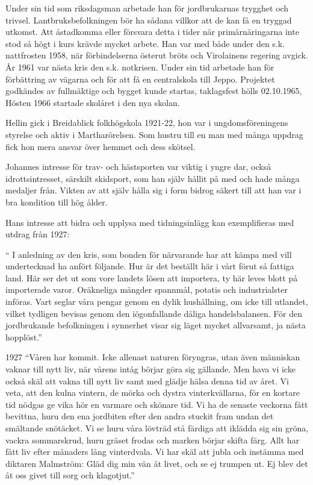 
Under sin tid som riksdagsman arbetade han för jordbrukarnas trygghet och trivsel. Lantbruksbefolkningen bör ha sådana villkor att de kan få en tryggad utkomst. Att åstadkomma eller försvara detta i tider när primärnäringarna inte stod så högt i kurs krävde mycket arbete. Han var med både under den s.k. nattfrosten 1958, när förbindelserna österut bröts och Virolainens regering avgick. År 1961 var nästa kris den s.k. notkrisen. Under sin tid arbetade han för förbättring av vägarna och för att få en centralskola till Jeppo. Projektet godkändes av fullmäktige och bygget kunde startas, taklagsfest hölls 02.10.1965, Hösten 1966 startade skolåret i den nya skolan.

Hellin gick i Breidablick folkhögskola 1921-22, hon  var i ungdomsföreningens styrelse och aktiv i Martharörelsen. Som hustru till en man med många uppdrag fick hon mera ansvar över hemmet och dess skötsel.

Johannes intresse för trav- och hästsporten var viktig i yngre dar, också idrottsintresset, särskilt skidsport, som han själv hållit på med och hade många medaljer från. Vikten av att själv hålla sig i form bidrog säkert till att han var i bra kondition till hög ålder.

Hans intresse att bidra och upplysa med tidningsinlägg kan exemplifieras med utdrag från 1927:

`` I anledning av den kris, som bonden för närvarande har att kämpa med vill undertecknad ha anfört följande. Hur är det beställt här i vårt förut så fattiga land. Här ser det ut som vore landets lösen att importera, ty här leves blott på importerade varor. Oräkneliga mängder spannmål, potatis och industrialster införas. Vart seglar våra pengar genom en dylik hushållning, om icke till utlandet, vilket tydligen bevisas genom den iögonfallande dåliga handelsbalansen.
För den jordbrukande befolkningen i synnerhet visar sig läget mycket allvarsamt, ja nästa hopplöst.''


 1927
``Våren har kommit. Icke allenast naturen föryngras, utan även människan vaknar  till nytt liv, när vårens intåg börjar göra sig gällande. Men hava vi icke också skäl att vakna till nytt liv samt med glädje hälsa denna tid av året. Vi veta, att den kulna vintern, de mörka och dystra vinterkvällarna, för en kortare tid nödgas ge vika hör en varmare och skönare tid. Vi ha de senaste veckorna fått bevittna, huru den ena jordbiten efter den andra stuckit fram undan det smältande snötäcket. Vi se huru våra lövträd stå färdiga att iklädda sig sin gröna, vackra sommarskrud, huru gräset frodas och marken börjar skifta färg. Allt har fått liv efter månaders lång vinterdvala. Vi har skäl att jubla och instämma med diktaren Malmström: Gläd dig min vän åt livet, och se ej trumpen ut. Ej blev det åt oss givet till sorg och klagotjut.''

